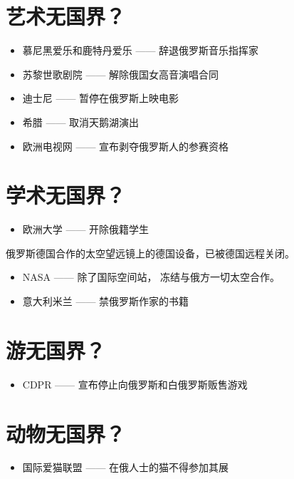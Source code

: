 \documentclass[UTF8, 11pt, oneside]{ctexart}
\begin{document}
\section{艺术无国界？}

\begin{itemize}
    \item 慕尼黑爱乐和鹿特丹爱乐 —— 辞退俄罗斯音乐指挥家
    \item 苏黎世歌剧院 —— 解除俄国女高音演唱合同
    \item 迪士尼 —— 暂停在俄罗斯上映电影
    \item 希腊 —— 取消天鹅湖演出
    \item 欧洲电视网 —— 宣布剥夺俄罗斯人的参赛资格
\end{itemize}



\section{学术无国界？}

\begin{itemize}
    \item 欧洲大学 —— 开除俄籍学生
\end{itemize}

俄罗斯德国合作的太空望远镜上的德国设备，已被德国远程关闭。

\begin{itemize}
    \item NASA  —— 除了国际空间站， 冻结与俄方一切太空合作。
    \item 意大利米兰 —— 禁俄罗斯作家的书籍
\end{itemize}



\section{游无国界？}

\begin{itemize}
    \item CDPR  —— 宣布停止向俄罗斯和白俄罗斯贩售游戏
\end{itemize}



\section{动物无国界？}

\begin{itemize}
    \item 国际爱猫联盟 —— 在俄人士的猫不得参加其展
\end{itemize}
\end{document}
